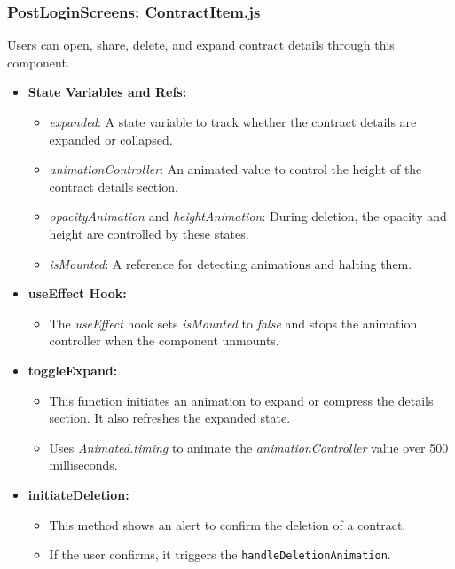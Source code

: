 \subsubsection{PostLoginScreens: ContractItem.js}

Users can open, share, delete, and expand contract details through this component. 

\begin{itemize}
    \item \textbf{State Variables and Refs:}
    \begin{itemize}
        \item \textit{expanded}: A state variable to track whether the contract details are expanded or collapsed.
        \item \textit{animationController}: An animated value to control the height of the contract details section.
        \item \textit{opacityAnimation} and \textit{heightAnimation}: During deletion, the opacity and height are controlled by these states.
        \item \textit{isMounted}: A reference for detecting animations and halting them.
    \end{itemize}

    \item \textbf{useEffect Hook:}
    \begin{itemize}
        \item The \textit{useEffect} hook sets \textit{isMounted} to \textit{false} and stops the animation controller when the component unmounts.
    \end{itemize}

    \item \textbf{toggleExpand:}
    \begin{itemize}
        \item This function initiates an animation to expand or compress the details section. It also refreshes the expanded state.
        \item Uses \textit{Animated.timing} to animate the \textit{animationController} value over 500 milliseconds.
    \end{itemize}

    \item \textbf{initiateDeletion:}
    \begin{itemize}
        \item This method shows an alert to confirm the deletion of a contract.
        \item If the user confirms, it triggers the \texttt{handleDeletionAnimation}.
    \end{itemize}


\end{itemize}
